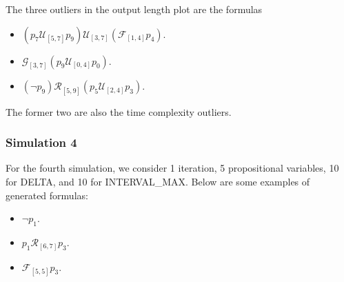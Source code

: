 \documentclass[runningheads]{llncs}
\begin{document}
The three outliers in the output length plot are the formulas 
\begin{itemize}
    \item $(p_7 \mathcal{U}_{[5,7]} p_9) \mathcal{U}_{[3,7]} (\mathcal{F}_{[1,4]} p_4)$.
    \item $\mathcal{G}_{[3,7]} (p_9 \mathcal{U}_{[0,4]} p_0)$.
    \item $(\neg p_9) \mathcal{R}_{[5,9]} (p_5 \mathcal{U}_{[2,4]} p_3)$.
\end{itemize}
The former two are also the time complexity outliers.

\subsubsection{Simulation 4}
For the fourth simulation, we consider 1 iteration, 5 propositional variables, 10 for DELTA, and 10 for INTERVAL\_MAX. Below are some examples of generated formulas:
\begin{itemize}
    \item $\neg p_1$.
    \item $p_1 \mathcal{R}_{[6,7]} p_3$.
    \item $\mathcal{F}_{[5,5]} p_3$.
\end{itemize}
\end{document}

